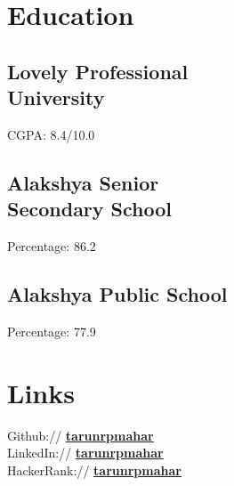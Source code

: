 \documentclass[]{deedy-resume-openfont}
\begin{document}
%
%


%
%

%
%

\begin{minipage}[t]{0.33\textwidth} 


\section{Education} 

\subsection{Lovely Professional\\ University}
CGPA: 8.4/10.0
\sectionsep

\subsection{Alakshya Senior \\Secondary School}
Percentage: 86.2%
\sectionsep

\subsection{Alakshya Public School}
Percentage: 77.9%
\sectionsep


\section{Links} 
Github:// \href{https://github.com/tarunrpmahar}{\bf tarunrpmahar} \\
LinkedIn://  \href{https://www.linkedin.com/in/tarunrpmahar/}{\bf tarunrpmahar} \\
HackerRank:// \href{https://www.hackerrank.com/tarunrpmahar}{\bf tarunrpmahar} 


\end{minipage}
\end{document}
